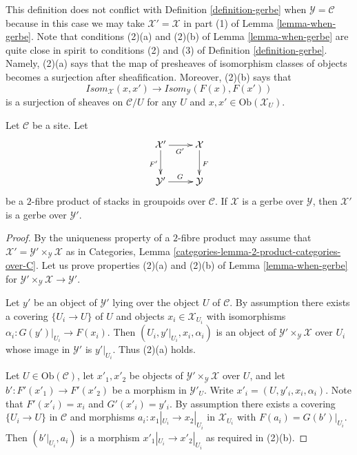\noindent
This definition does not conflict with
Definition \ref{definition-gerbe}
when $\mathcal{Y} = \mathcal{C}$ because in this case we may take
$\mathcal{X}' = \mathcal{X}$ in part (1) of
Lemma \ref{lemma-when-gerbe}.
Note that conditions (2)(a) and (2)(b) of
Lemma \ref{lemma-when-gerbe}
are quite close in spirit to conditions (2) and (3) of
Definition \ref{definition-gerbe}.
Namely, (2)(a) says that the map of presheaves of isomorphism
classes of objects becomes a surjection after sheafification.
Moreover, (2)(b) says that
$$
\mathit{Isom}_\mathcal{X}(x, x')
\longrightarrow
\mathit{Isom}_\mathcal{Y}(F(x), F(x'))
$$
is a surjection of sheaves on $\mathcal{C}/U$ for any $U$ and
$x, x' \in \text{Ob}(\mathcal{X}_U)$.

\begin{lemma}
\label{lemma-base-change-gerbe}
Let $\mathcal{C}$ be a site. Let
$$
\xymatrix{
\mathcal{X}' \ar[r]_{G'} \ar[d]_{F'} & \mathcal{X} \ar[d]^F \\
\mathcal{Y}' \ar[r]^G & \mathcal{Y}
}
$$
be a $2$-fibre product of stacks in groupoids over $\mathcal{C}$.
If $\mathcal{X}$ is a gerbe over $\mathcal{Y}$, then
$\mathcal{X}'$ is a gerbe over $\mathcal{Y}'$.
\end{lemma}

\begin{proof}
By the uniqueness property of a $2$-fibre product may assume that
$\mathcal{X}' = \mathcal{Y}' \times_\mathcal{Y} \mathcal{X}$
as in
Categories, Lemma \ref{categories-lemma-2-product-categories-over-C}.
Let us prove properties (2)(a) and (2)(b) of
Lemma \ref{lemma-when-gerbe}
for $\mathcal{Y}' \times_\mathcal{Y} \mathcal{X} \to \mathcal{Y}'$.

\medskip\noindent
Let $y'$ be an object of $\mathcal{Y}'$ lying over the object $U$
of $\mathcal{C}$. By assumption there exists
a covering $\{U_i \to U\}$ of $U$ and objects
$x_i \in \mathcal{X}_{U_i}$ with isomorphisms
$\alpha_i : G(y')|_{U_i} \to F(x_i)$.
Then $(U_i, y'|_{U_i}, x_i, \alpha_i)$ is an object of
$\mathcal{Y}' \times_\mathcal{Y} \mathcal{X}$ over $U_i$
whose image in $\mathcal{Y}'$ is $y'|_{U_i}$. Thus (2)(a) holds.

\medskip\noindent
Let $U \in \text{Ob}(\mathcal{C})$, let $x'_1, x'_2$ be objects of
$\mathcal{Y}' \times_\mathcal{Y} \mathcal{X}$ over $U$, and let
$b' : F'(x'_1) \to F'(x'_2)$ be a morphism in $\mathcal{Y}'_U$.
Write $x'_i = (U, y'_i, x_i, \alpha_i)$. Note that $F'(x'_i) = x_i$
and $G'(x'_i) = y'_i$. By assumption there exists
a covering $\{U_i \to U\}$ in $\mathcal{C}$ and morphisms
$a_i : x_1|_{U_i} \to x_2|_{U_i}$ in $\mathcal{X}_{U_i}$ with
$F(a_i) = G(b')|_{U_i}$. Then $(b'|_{U_i}, a_i)$ is a morphism
$x'_1|_{U_i} \to x'_2|_{U_i}$ as required in (2)(b).
\end{proof}


